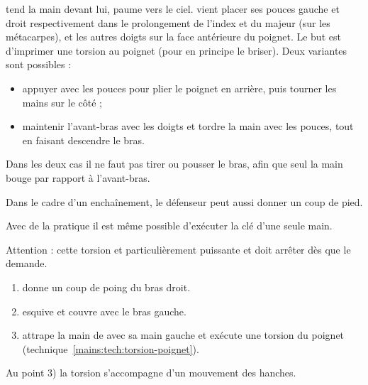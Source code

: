 \begin{technique}
\label{mains:tech:torsion-poignet}

\A tend la main devant lui, paume vers le ciel.
\D vient placer ses pouces gauche et droit respectivement dans le prolongement de l'index et du majeur (sur les métacarpes), et les autres doigts sur la face antérieure du poignet.
Le but est d'imprimer une torsion au poignet (pour en principe le briser).
Deux variantes sont possibles :
\begin{itemize}
	\item appuyer avec les pouces pour plier le poignet en arrière, puis tourner les mains sur le côté ;
	\item maintenir l'avant-bras avec les doigts et tordre la main avec les pouces, tout en faisant descendre le bras.
\end{itemize}
Dans les deux cas il ne faut pas tirer ou pousser le bras, afin que seul la main bouge par rapport à l'avant-bras.

Dans le cadre d'un enchaînement, le défenseur peut aussi donner un coup de pied.

Avec de la pratique il est même possible d'exécuter la clé d'une seule main.

Attention : cette torsion et particulièrement puissante et \D doit arrêter dès que \A le demande.
\end{technique}


\begin{technique}

\begin{enumerate}
	\item \A donne un coup de poing du bras droit.
	
	\item \D esquive et couvre avec le bras gauche.
	
	\item \D attrape la main de \A avec sa main gauche et exécute une torsion du poignet (technique~\ref{mains:tech:torsion-poignet}).
\end{enumerate}

Au point 3) la torsion s'accompagne d'un mouvement des hanches.
\end{technique}

